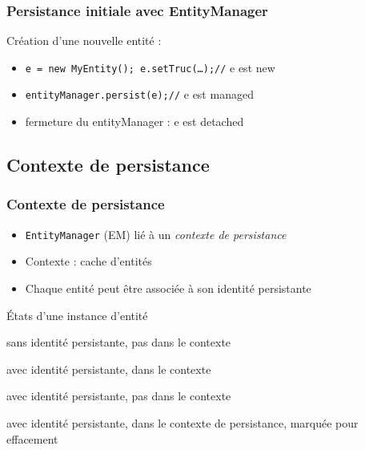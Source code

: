 \documentclass[french, english]{beamer}
\begin{document}
\begin{frame}
	\frametitle{Persistance initiale avec EntityManager}
	Création d’une nouvelle entité :
	\begin{itemize}
		\item \texttt{e = new MyEntity(); e.setTruc(…);//} e est \og{}new\fg{}
		\item \texttt{entityManager.persist(e);//} e est \og{}managed\fg{}
		\item fermeture du entityManager : e est \og{}detached\fg{}
	\end{itemize}
\end{frame}

\subsection{Contexte de persistance}
\begin{frame}
	\frametitle{Contexte de persistance}
	\begin{itemize}
		\item \texttt{EntityManager} (EM) lié à un \emph{contexte de persistance}
		\item Contexte : cache d’entités
		\item Chaque entité peut être associée à son identité persistante
	\end{itemize}
	\begin{block}{États d’une instance d’entité}
		\begin{description}[detached]
			\item[new] sans identité persistante, pas dans le contexte
			\item[managed] avec identité persistante, dans le contexte
			\item[detached] avec identité persistante, pas dans le contexte
			\item[removed] avec identité persistante, dans le contexte de persistance, marquée pour effacement
		\end{description}
	\end{block}
\end{frame}
\end{document}
